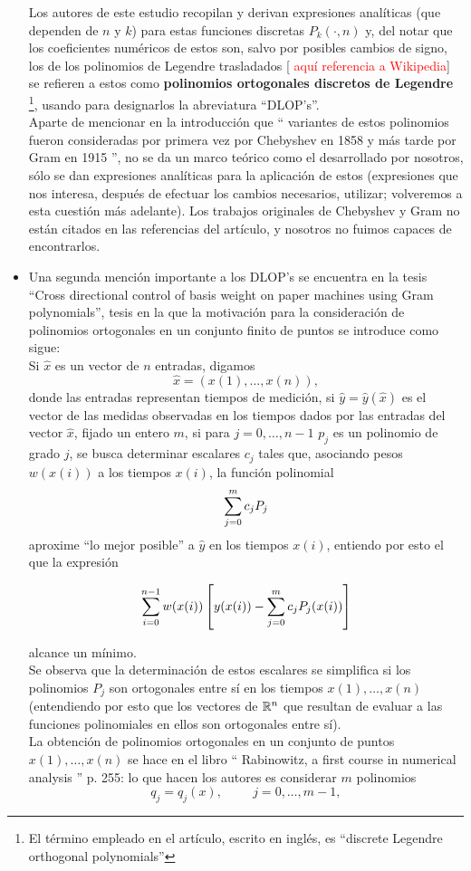 \begin{itemize}
Los autores de este estudio recopilan y derivan expresiones
analíticas (que dependen de $n$ y $k$) para estas funciones
discretas $P_{k}(\cdot ,n)$ y, del notar que los coeficientes
numéricos de estos son, salvo por posibles cambios de signo,
los de los polinomios de Legendre trasladados [
\textcolor{red}{aquí referencia a Wikipedia}] se refieren a 
estos como \textbf{polinomios ortogonales
discretos de Legendre} \footnote{El término empleado en el artículo,
escrito en inglés, es ``discrete Legendre orthogonal
polynomials''}, usando para designarlos la abreviatura
 ``DLOP's''. \\

Aparte de mencionar en la introducción que
`` variantes de estos polinomios fueron consideradas por primera
vez por Chebyshev en 1858 y más tarde por Gram en 1915 '', no se
da un marco teórico como el desarrollado por nosotros, sólo 
se dan expresiones analíticas para la aplicación de estos
(expresiones que nos interesa, después de efectuar los
cambios necesarios, utilizar; volveremos a esta cuestión más
adelante). Los trabajos originales de Chebyshev y Gram
no están citados en las referencias del artículo, y 
nosotros no fuimos capaces de 
encontrarlos. 


\item  Una segunda mención importante a los DLOP's se encuentra en 
la tesis ``Cross directional control of basis weight on paper machines
using Gram polynomials'', tesis en la que la motivación para la consideración de
polinomios ortogonales en un conjunto finito de puntos se
introduce como sigue: \\


Si $\hat{x}$ es un vector de $n$ entradas, digamos
\[
\hat{x}=(x(1), \ldots , x(n)),
\]
donde las entradas representan tiempos de medición,
si $\hat{y}=\hat{y}(\hat{x})$ es el vector de las medidas 
observadas en los tiempos dados por las entradas del vector $\hat{x}$,
fijado un entero $m$, si para $j=0, \ldots , n-1$
$p_{j}$ es un polinomio de grado $j$, se busca determinar escalares
$c_{j}$ tales que, asociando pesos $w(x(i))$ a los tiempos $x(i)$,
la función polinomial
\[
\sum\limits_{j=0}^{m}c_{j}P_{j}
\]
aproxime ``lo mejor posible'' a $\hat{y}$ en los tiempos $x(i)$, 
entiendo por esto el que la expresión

\[
\sum\limits_{i=0}^{n-1}w(x(i))\left[ y(x(i))- 
\sum\limits_{j=0}^{m}c_{j}P_{j}(x(i)) \right]
\]

alcance un mínimo. \\
Se observa que la determinación de estos escalares se
simplifica si los polinomios $P_{j}$ son ortogonales
entre sí en los tiempos $x(1), \ldots , x(n)$ (entendiendo
por esto que los vectores de $\mathbb{R}^{n}$ que resultan de evaluar
a las funciones polinomiales en ellos son ortogonales entre sí). \\
La obtención de polinomios ortogonales en un
conjunto de puntos $x(1), \ldots , x(n)$ se hace en el 
libro `` Rabinowitz, a first course in numerical analysis ''
p. 255: lo que hacen los autores es
considerar $m$ polinomios
\[
q_{j}=q_{j}(x),\hspace{1cm} j=0, \ldots , m-1,
\]


\end{itemize}
